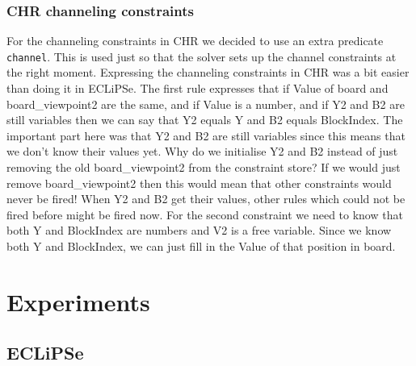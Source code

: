 \documentclass{report}
\begin{document}
\subsubsection{CHR channeling constraints}

For the channeling constraints in CHR we decided to use an extra predicate \texttt{channel}. This is used just so that the solver sets up the channel constraints at the right moment. Expressing the channeling constraints in CHR was a bit easier than doing it in ECLiPSe. The first rule expresses that if Value of board and board\_viewpoint2 are the same, and if Value is a number, and if Y2 and B2 are still variables then we can say that Y2 equals Y and B2 equals BlockIndex. The important part here was that Y2 and B2 are still variables since this means that we don't know their values yet. Why do we initialise Y2 and B2 instead of just removing the old board\_viewpoint2 from the constraint store? If we would just remove board\_viewpoint2 then this would mean that other constraints would never be fired! When Y2 and B2 get their values, other rules which could not be fired before might be fired now.
\newline
\newline
For the second constraint we need to know that both Y and BlockIndex are numbers and V2 is a free variable. Since we know both Y and BlockIndex, we can just fill in the Value of that position in board.
\newpage
\section{Experiments}
\subsection{ECLiPSe}
\end{document}
